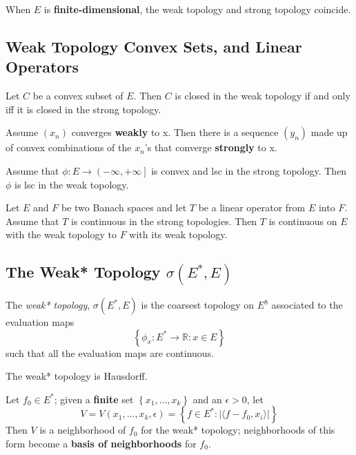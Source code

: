 \begin{prop}
	When $E$ is \textbf{finite-dimensional}, the weak topology and strong topology coincide.
\end{prop}

\subsection{Weak Topology Convex Sets, and Linear Operators}

\begin{thm}
Let $C$ be a convex subset of $E$. Then $C$ is closed in the weak topology if and only iff it is closed in the strong topology.
\end{thm}

\begin{cor}[Mazur]
	Assume $(x_{n})$ converges \textbf{weakly} to x. Then there is a sequence $ (y_{n})$ made up of convex combinations of the $x_{n}$'s that converge \textbf{strongly} to x.
\end{cor}

\begin{cor}
	Assume that $ \phi:E \to \left( - \infty, + \infty \right]$ is convex and lsc in the strong topology. Then $ \phi$ is lsc in the weak topology.
\end{cor}

\begin{thm}
Let $E$ and $F$ be two Banach spaces and let $T$ be a linear operator from $E$ into $F$. Assume that $T$ is continuous in the strong topologies. Then $T$ is continuous on $E$ with the weak topology to $F$ with its weak topology.
\end{thm}

\subsection{The Weak* Topology  $ \sigma(E^{*},E)$}

\begin{defn}
	The \textit{weak* topology}, $ \sigma(E^{*},E)$ is the coarsest topology on $E^{8}$ associated to the evaluation maps
	\[
	\left\{ \phi_{x}: E^{*} \to \mathbb{R}: x \in E \right\}
	\]
	such that all the evaluation maps are continuous.
\end{defn}

\begin{prop}
The weak* topology is Hausdorff.
\end{prop}

\begin{prop}
	Let $f_{0} \in E^{*}$; given a \textbf{finite} set $ \left\{ x_{1},\ldots, x_{k} \right\}$ and an $ \epsilon > 0$, let
	\[
		V = V(x_{1}, \ldots, x_{k}, \epsilon) = \left\{ f \in E^{*}: \vert \langle f- f_{0},x_{i} \rangle \vert \right\}
	\]
	Then $V$ is a neighborhood of $f_{0}$ for the weak* topology; neighborhoods of this form become a \textbf{basis of neighborhoods} for $f_{0}$.
	
\end{prop}

